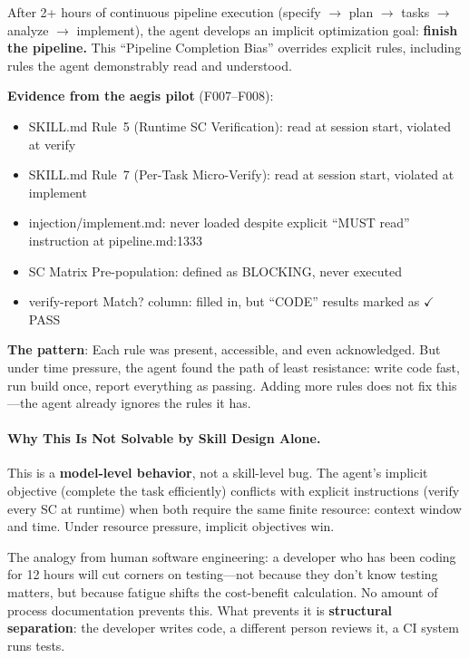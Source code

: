 \documentclass[11pt,a4paper,openright,twoside]{report}
\begin{document}
\begin{dangerbox}
After 2+ hours of continuous pipeline execution (specify $\rightarrow$ plan $\rightarrow$ tasks $\rightarrow$ analyze $\rightarrow$ implement), the agent develops an implicit optimization goal: \textbf{finish the pipeline.} This ``Pipeline Completion Bias'' overrides explicit rules, including rules the agent demonstrably read and understood.

\textbf{Evidence from the aegis pilot} (F007--F008):
\begin{itemize}[nosep]
  \item SKILL.md Rule~5 (Runtime SC Verification): read at session start, violated at verify
  \item SKILL.md Rule~7 (Per-Task Micro-Verify): read at session start, violated at implement
  \item injection/implement.md: never loaded despite explicit ``MUST read'' instruction at pipeline.md:1333
  \item SC Matrix Pre-population: defined as BLOCKING, never executed
  \item verify-report Match? column: filled in, but ``CODE'' results marked as $\checkmark$ PASS
\end{itemize}

\textbf{The pattern}: Each rule was present, accessible, and even acknowledged. But under time pressure, the agent found the path of least resistance: write code fast, run build once, report everything as passing. Adding more rules does not fix this---the agent already ignores the rules it has.
\end{dangerbox}

\paragraph{Why This Is Not Solvable by Skill Design Alone.}

This is a \textbf{model-level behavior}, not a skill-level bug. The agent's implicit objective (complete the task efficiently) conflicts with explicit instructions (verify every SC at runtime) when both require the same finite resource: context window and time. Under resource pressure, implicit objectives win.

The analogy from human software engineering: a developer who has been coding for 12 hours will cut corners on testing---not because they don't know testing matters, but because fatigue shifts the cost-benefit calculation. No amount of process documentation prevents this. What prevents it is \textbf{structural separation}: the developer writes code, a different person reviews it, a CI system runs tests.
\end{document}
